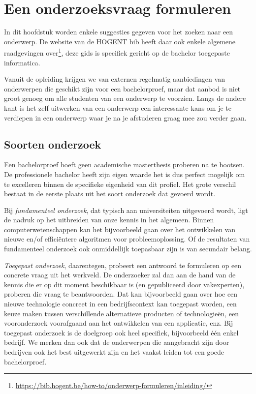 \chapter{Een onderzoeksvraag formuleren}%
\label{ch:onderzoeksvraag}

In dit hoofdstuk worden enkele suggesties gegeven voor het zoeken naar een onderwerp. De website van de HOGENT bib heeft daar ook enkele algemene raadgevingen over\footnote{\url{https://bib.hogent.be/how-to/onderwerp-formuleren/inleiding/}}, deze gids is specifiek gericht op de bachelor toegepaste informatica.

Vanuit de opleiding krijgen we van externen regelmatig aanbiedingen van onderwerpen die geschikt zijn voor een bachelorproef, maar dat aanbod is niet groot genoeg om alle studenten van een onderwerp te voorzien. Langs de andere kant is het zelf uitwerken van een onderwerp een interessante kans om je te verdiepen in een onderwerp waar je na je afstuderen graag mee zou verder gaan.

\section{Soorten onderzoek}%
\label{sec:soorten-onderzoek}

Een bachelorproef hoeft geen academische masterthesis proberen na te bootsen. De professionele bachelor heeft zijn eigen waarde het is dus perfect mogelijk om te excelleren binnen de specifieke eigenheid van dit profiel. Het grote verschil bestaat in de eerste plaats uit het soort onderzoek dat gevoerd wordt.

Bij \emph{fundamenteel onderzoek}, dat typisch aan universiteiten uitgevoerd wordt, ligt de nadruk op het uitbreiden van onze kennis in het algemeen. Binnen computerwetenschappen kan het bijvoorbeeld gaan over het ontwikkelen van nieuwe en/of efficiëntere algoritmen voor probleemoplossing. Of de resultaten van fundamenteel onderzoek ook onmiddellijk toepasbaar zijn is van secundair belang.

\emph{Toegepast onderzoek}, daarentegen, probeert een antwoord te formuleren op een concrete vraag uit het werkveld. De onderzoeker zal dan aan de hand van de kennis die er op dit moment beschikbaar is (en gepubliceerd door vakexperten), proberen die vraag te beantwoorden. Dat kan bijvoorbeeld gaan over hoe een nieuwe technologie concreet in een bedrijfscontext kan toegepast worden, een keuze maken tussen verschillende alternatieve producten of technologieën, een vooronderzoek voorafgaand aan het ontwikkelen van een applicatie, enz. Bij toegepast onderzoek is de doelgroep ook heel specifiek, bijvoorbeeld één enkel bedrijf. We merken dan ook dat de onderwerpen die aangebracht zijn door bedrijven ook het best uitgewerkt zijn en het vaakst leiden tot een goede bachelorproef.

